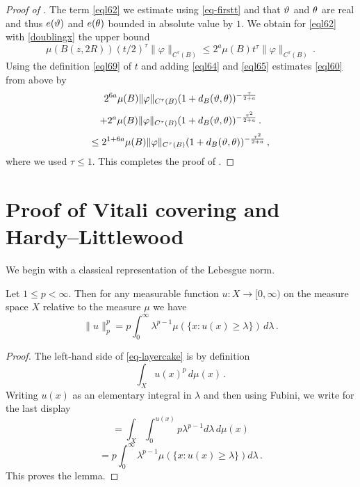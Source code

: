 \begin{proof}[Proof of ]
The term \eqref{eql62} we estimate using
\eqref{eq-firstt} and that
${\vartheta}$ and ${\theta}$ are real and thus $e({\vartheta})$ and
$e({\theta})$ bounded in absolute value by $1$.
We obtain for \eqref{eql62} with \eqref{doublingx}
the upper bound
  \begin{equation}\label{eql65}
      \mu(B(z,2R)) (t/2)^{\tau} \|\varphi\|_{C^\tau(B)}
      \le 2^a \mu(B) t^{\tau} \|\varphi\|_{C^\tau(B)}
      \,.
 \end{equation}
Using the definition \eqref{eql69} of $t$ and adding
\eqref{eql64} and \eqref{eql65} estimates
\eqref{eql60} from above by
\begin{equation}
       2^{6a} \mu(B) \|{\varphi}\|_{C^\tau(B)}
       (1 + d_{B}({\vartheta},{\theta}))^{-\frac{\tau}{2+a}}
       \end{equation}
\begin{equation} +
        2^a \mu(B) \|{\varphi}\|_{C^\tau(B)}
       (1 + d_{B}({\vartheta},{\theta}))^{-\frac{\tau^2}{2+a}}\, .
 \end{equation}
\begin{equation}\label{eql66}
      \le 2^{1+6a} \mu(B) \|{\varphi}\|_{C^\tau(B)}
       (1 + d_{B}({\vartheta},{\theta}))^{-\frac{\tau^2}{2+a}} \, ,
 \end{equation}
where we used $\tau\le 1$.
This completes the proof of .
\end{proof}

\section{Proof of Vitali covering and Hardy--Littlewood}
\label{sec-hlm}


We begin with a classical representation of the Lebesgue norm.
\begin{lemma}\label{layer-cake-representation}
\leanok
{}
Let $1\le p< \infty$. Then for any measurable function $u:X\to [0,\infty)$ on the measure space $X$
relative to the measure $\mu$
we have
\begin{equation}\label{eq-layercake}
    \|u\|_p^p=p\int_0^\infty \lambda^{p-1}\mu(\{x: u(x)\ge \lambda\})\, d\lambda\, .
\end{equation}
\end{lemma}
\begin{proof}
    \leanok
    The left-hand side of \eqref{eq-layercake} is by definition
\begin{equation}
    \int_X u(x)^p \, d\mu(x)\, .\end{equation}
    Writing $u(x)$ as an elementary integral in $\lambda$ and then using Fubini, we write for the last display
    \begin{equation}
    =\int_X \int _0^{u(x)}
    p \lambda^{p-1} d\lambda\, d\mu(x)
\end{equation}
\begin{equation}
 =p\int _0^{\infty}
    \lambda^{p-1} \mu(\{x: u(x)\ge \lambda\}) d\lambda\, .
\end{equation}
This proves the lemma.
\end{proof}


